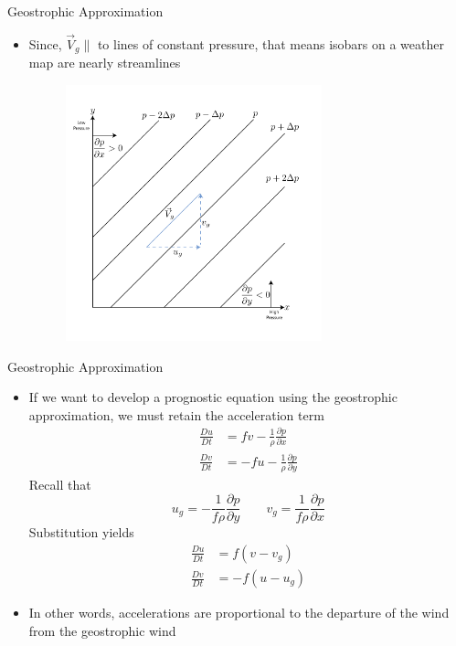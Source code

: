 \begin{frame}{Geostrophic Approximation}
\begin{itemize}
	\item Since, $\vec{V}_g \parallel $ to lines of constant pressure, that means isobars on a weather map are nearly streamlines
	\begin{figure}
	\includegraphics[width=0.7\textwidth]{fig1}	
	\end{figure}
\end{itemize}
\end{frame}
\begin{frame}{Geostrophic Approximation}
\begin{itemize}
	\item If we want to develop a prognostic equation using the geostrophic approximation, we must retain the acceleration term
	\begin{align*}
	\frac{Du}{Dt} &= fv - \frac{1}{\rho}\frac{\partial p}{\partial x}\\
	\frac{Dv}{Dt} &= -fu -\frac{1}{\rho}\frac{\partial p}{\partial y}
	\end{align*}
	Recall that 
	$$u_g = -\frac{1}{f\rho}\frac{\partial p}{\partial y}\qquad v_g = \frac{1}{f\rho}\frac{\partial p}{\partial x}$$
	Substitution yields
	\begin{align*}
	\frac{Du}{Dt} &= f(v-v_g)\\
	\frac{Dv}{Dt} &= -f(u-u_g)
	\end{align*}
	\item In other words, accelerations are proportional to the departure of the wind from the geostrophic wind
\end{itemize}
\end{frame}

